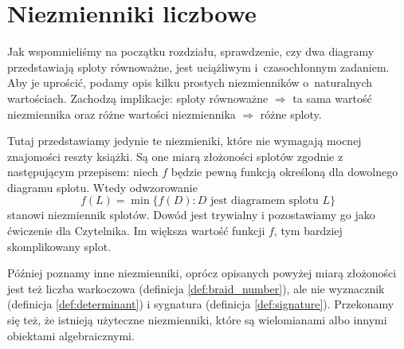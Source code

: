 
\section{Niezmienniki liczbowe}
Jak wspomnieliśmy na początku rozdziału, sprawdzenie,
czy dwa diagramy przedstawiają sploty równoważne,
jest uciążliwym i~czasochłonnym zadaniem.
Aby je uprościć, podamy opis kilku prostych niezmienników o~naturalnych wartościach.
Zachodzą implikacje:
sploty równoważne $\Rightarrow$ ta sama wartość niezmiennika
oraz różne wartości niezmiennika $\Rightarrow$ różne sploty.

Tutaj przedstawiamy jedynie te niezmieniki, które nie wymagają mocnej znajomości reszty książki.
Są one miarą złożoności splotów zgodnie z następującym przepisem: niech $f$ będzie pewną funkcją określoną dla dowolnego diagramu splotu.
Wtedy odwzorowanie
\begin{equation}
    f(L) = \min \{f(D) : D \text{ jest diagramem splotu } L\}
\end{equation}
stanowi niezmiennik splotów.
Dowód jest trywialny i pozostawiamy go jako ćwiczenie dla Czytelnika.
Im większa wartość funkcji $f$, tym bardziej skomplikowany splot.

Później poznamy inne niezmienniki, oprócz opisanych powyżej miarą złożoności jest też liczba warkoczowa (definicja \ref{def:braid_number}), ale nie wyznacznik (definicja \ref{def:determinant}) i sygnatura (definicja \ref{def:signature}).
Przekonamy się też, że istnieją użyteczne niezmienniki, które są wielomianami albo innymi obiektami algebraicznymi.















